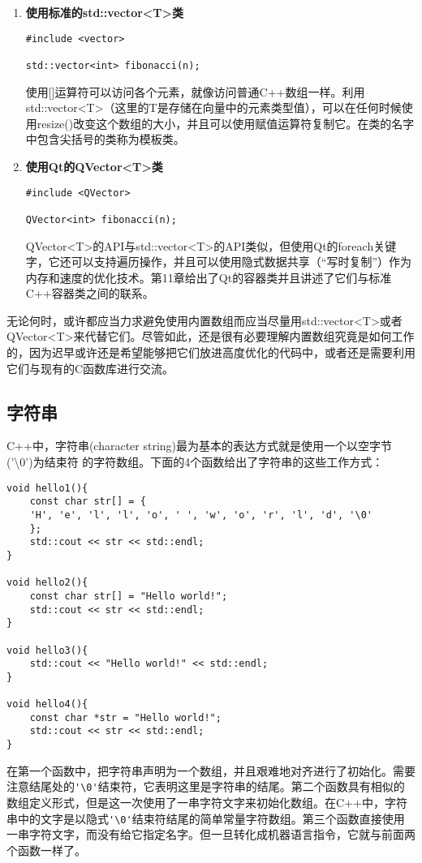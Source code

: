 \documentclass[11pt,oneside]{book}
\begin{document}
\begin{common-format}
\begin{enumerate}
\item \textbf{使用标准的std::vector<T>类}

\begin{Verbatim}
#include <vector>

std::vector<int> fibonacci(n);
\end{Verbatim}

使用[]运算符可以访问各个元素，就像访问普通C++数组一样。利用std::vector<T>（这里的T是存储在向量中的元素类型值），可以在任何时候使用resize()改变这个数组的大小，并且可以使用赋值运算符复制它。在类的名字中包含尖括号的类称为模板类。

\item \textbf{使用Qt的QVector<T>类}

\begin{Verbatim}
#include <QVector>

QVector<int> fibonacci(n);
\end{Verbatim}

QVector<T>的API与std::vector<T>的API类似，但使用Qt的foreach关键字，它还可以支持遍历操作，并且可以使用隐式数据共享（“写时复制”）作为内存和速度的优化技术。第11章给出了Qt的容器类并且讲述了它们与标准C++容器类之间的联系。
\end{enumerate}

无论何时，或许都应当力求避免使用内置数组而应当尽量用std::vector<T>或者QVector<T>来代替它们。尽管如此，还是很有必要理解内置数组究竟是如何工作的，因为迟早或许还是希望能够把它们放进高度优化的代码中，或者还是需要利用它们与现有的C函数库进行交流。


\subsection{字符串}
C++中，字符串(character string)最为基本的表达方式就是使用一个以空字节('\textbackslash{}0')为结束符
的字符数组。下面的4个函数给出了字符串的这些工作方式：
\begin{Verbatim}
void hello1(){
    const char str[] = {
    'H', 'e', 'l', 'l', 'o', ' ', 'w', 'o', 'r', 'l', 'd', '\0'
    };
    std::cout << str << std::endl;
}

void hello2(){
    const char str[] = "Hello world!";
    std::cout << str << std::endl;
}

void hello3(){
    std::cout << "Hello world!" << std::endl;
}

void hello4(){
    const char *str = "Hello world!";
    std::cout << str << std::endl;
}
\end{Verbatim}

在第一个函数中，把字符串声明为一个数组，并且艰难地对齐进行了初始化。需要注意结尾处的\verb+'\0'+结束符，它表明这里是字符串的结尾。第二个函数具有相似的数组定义形式，但是这一次使用了一串字符文字来初始化数组。在C++中，字符串中的文字是以隐式\verb+'\0'+结束符结尾的简单常量字符数组。第三个函数直接使用一串字符文字，而没有给它指定名字。但一旦转化成机器语言指令，它就与前面两个函数一样了。


\end{common-format}
\end{document}
